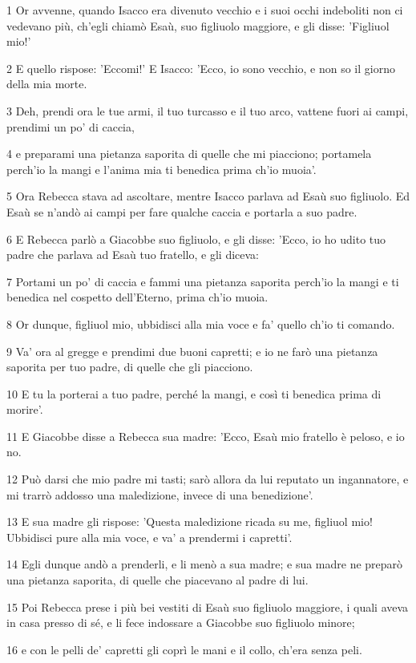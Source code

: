 \par 1 Or avvenne, quando Isacco era divenuto vecchio e i suoi occhi indeboliti non ci vedevano più, ch'egli chiamò Esaù, suo figliuolo maggiore, e gli disse: 'Figliuol mio!'
\par 2 E quello rispose: 'Eccomi!' E Isacco: 'Ecco, io sono vecchio, e non so il giorno della mia morte.
\par 3 Deh, prendi ora le tue armi, il tuo turcasso e il tuo arco, vattene fuori ai campi, prendimi un po' di caccia,
\par 4 e preparami una pietanza saporita di quelle che mi piacciono; portamela perch'io la mangi e l'anima mia ti benedica prima ch'io muoia'.
\par 5 Ora Rebecca stava ad ascoltare, mentre Isacco parlava ad Esaù suo figliuolo. Ed Esaù se n'andò ai campi per fare qualche caccia e portarla a suo padre.
\par 6 E Rebecca parlò a Giacobbe suo figliuolo, e gli disse: 'Ecco, io ho udito tuo padre che parlava ad Esaù tuo fratello, e gli diceva:
\par 7 Portami un po' di caccia e fammi una pietanza saporita perch'io la mangi e ti benedica nel cospetto dell'Eterno, prima ch'io muoia.
\par 8 Or dunque, figliuol mio, ubbidisci alla mia voce e fa' quello ch'io ti comando.
\par 9 Va' ora al gregge e prendimi due buoni capretti; e io ne farò una pietanza saporita per tuo padre, di quelle che gli piacciono.
\par 10 E tu la porterai a tuo padre, perché la mangi, e così ti benedica prima di morire'.
\par 11 E Giacobbe disse a Rebecca sua madre: 'Ecco, Esaù mio fratello è peloso, e io no.
\par 12 Può darsi che mio padre mi tasti; sarò allora da lui reputato un ingannatore, e mi trarrò addosso una maledizione, invece di una benedizione'.
\par 13 E sua madre gli rispose: 'Questa maledizione ricada su me, figliuol mio! Ubbidisci pure alla mia voce, e va' a prendermi i capretti'.
\par 14 Egli dunque andò a prenderli, e li menò a sua madre; e sua madre ne preparò una pietanza saporita, di quelle che piacevano al padre di lui.
\par 15 Poi Rebecca prese i più bei vestiti di Esaù suo figliuolo maggiore, i quali aveva in casa presso di sé, e li fece indossare a Giacobbe suo figliuolo minore;
\par 16 e con le pelli de' capretti gli coprì le mani e il collo, ch'era senza peli.
